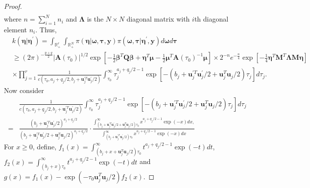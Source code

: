 \documentclass[11pt,a4paper]{article}
\begin{document}
\begin{proof}
\begin{align*}
\end{align*}
where $n = \sum_{i=1}^{N} n_i$ and $\bm{\Lambda}$ is the $N \times N$ diagonal matrix with $i$th diagonal element $n_i$. Thus, 
\begin{align*}
& k(\bm{\eta}|\bm{\eta}^{\prime }) = \int_{\mathbb{R}_+^{r}}\int_{\mathbb{R}_{+}^{N}}\pi(\bm{\eta}|\bm{\omega},\bm{\tau},\bm{y})\pi(\bm{\omega,\tau}|\bm{\eta}^{\prime},\bm{y})d\bm{\omega}d\bm{\tau}\\
& \geq\left(2\pi\right)^{-\frac{p+q}{2}}\left|\bm{A}\left(\tau_{0}\right)\right|^{1/2}\exp\left[-\frac{1}{2}\bm{\beta}^{T}\bm{Q}\bm{\beta}+\bm{\eta}^{T}\bm{\mu}-\frac{1}{2}\bm{\mu}^{T}\bm{A}\left(\tau_{0}\right)^{-1}\bm{\mu}\right]\times {2^{-n}e^{-\frac{n}{4}}\exp\left[-\frac{1}{4}\bm{\eta}^{T}\bm{M}^{T}\bm{\Lambda}\bm{M}\bm{\eta}\right]}\\
& \times \prod_{j=1}^{r}\frac{1}{c\left(\tau_{0},a_{j} + q_j/2,b_{j} + \bm{u}_{j}^{\prime T}\bm{u}_{j}^{\prime}/2\right)}\int_{\tau_{0}}^{\infty}\tau_{j}^{a_{j}+q_{j}/2-1}\exp\left[-\left(b_{j}+\bm{u}_{j}^{\prime T}\bm{u}_{j}^{\prime}/2+\bm{u}_{j}^{T}\bm{u}_{j}/2\right)\tau_{j}\right]d\tau_{j}.
\end{align*}
Now consider 
\begin{align*}
 & \frac{1}{c\left(\tau_{0},a_{j} + q_j/2,b_{j} +\bm{u}_{j}^{\prime T}\bm{u}_{j}^{\prime}/2\right)}\int_{\tau_{0}}^{\infty}\tau_{j}^{a_{j}+q_{j}/2-1}\exp\left[-\left(b_{j}+\bm{u}_{j}^{\prime T}\bm{u}_{j}^{\prime}/2+\bm{u}_{j}^{T}\bm{u}_{j}/2\right)\tau_{j}\right]d\tau_{j}\\
= & \frac{\left(b_{j}+\bm{u}_{j}^{\prime T}\bm{u}_{j}^{\prime}/2\right)^{a_{j}+q_{j}/2}}{\left(b_{j}+\bm{u}_{j}^{\prime T}\bm{u}_{j}^{\prime}/2+\bm{u}_{j}^{T}\bm{u}_{j}/2\right)^{a_{j}+q_{j}/2}}\cdot\frac{\int_{\left(b_{j}+\bm{u}_{j}^{\prime T}\bm{u}_{j}^{\prime}/2+\bm{u}_{j}^{T}\bm{u}_{j}/2\right)\tau_{0}}^{\infty}x^{a_{j}+q_{j}/2-1}\exp\left(-x\right)dx,}{\int_{\left(b_{j}+\bm{u}_{j}^{\prime T}\bm{u}_{j}^{\prime}/2\right)\tau_{0}}^{\infty}x^{a_{j}+q_{j}/2-1}\exp\left(-x\right)dx}
\end{align*}
For $x\geq 0 $, define,
$f_{1}\left(x\right)  =\int_{\left(b_{j}+x+\bm{u}_{j}^{T}\bm{u}_{j}/2\right)\tau_{0}}^{\infty}t^{a_{j}+q_{j}/2-1}\exp\left(-t\right)dt$, 
$f_{2}\left(x\right) =\int_{\left(b_{j}+x\right)\tau_{0}}^{\infty}t^{a_{j}+q_{j}/2-1}\exp\left(-t\right)dt$ and $g\left(x\right) =f_{1}\left(x\right)-\exp\left(-\tau_{0}\bm{u}_{j}^{T}\bm{u}_{j}/2\right)f_{2}\left(x\right)$. 

\end{proof}
\end{document}
